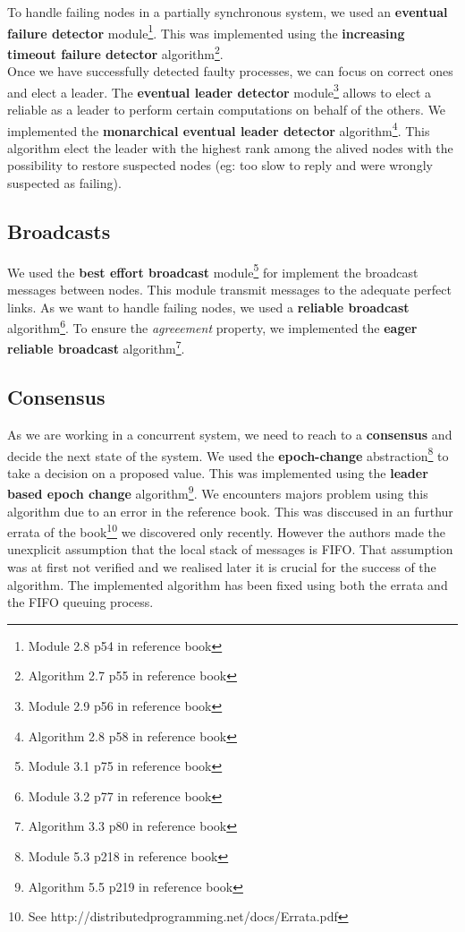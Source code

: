\documentclass[11pt,english,a4paper]{article}
\begin{document}
To handle failing nodes in a partially synchronous system, we used an \textbf{eventual failure detector} module\footnote{Module 2.8 p54 in reference book}.
This was implemented using the \textbf{increasing timeout failure detector} algorithm\footnote{Algorithm 2.7 p55 in reference book}.\\

Once we have successfully detected faulty processes, we can focus on correct ones and elect a leader.
The \textbf{eventual leader detector} module\footnote{Module 2.9 p56 in reference book} allows to elect a reliable as a leader to perform certain computations on behalf of the others.
We implemented the \textbf{monarchical eventual leader detector} algorithm\footnote{Algorithm 2.8 p58 in reference book}.
This algorithm elect the leader with the highest rank among the alived nodes with the possibility to restore suspected nodes (eg: too slow to reply and were wrongly suspected as failing).

\subsection*{Broadcasts}
We used the \textbf{best effort broadcast} module\footnote{Module 3.1 p75 in reference book} for implement the broadcast messages between nodes.
This module transmit messages to the adequate perfect links.
As we want to handle failing nodes, we used a \textbf{reliable broadcast} algorithm\footnote{Module 3.2 p77 in reference book}.
To ensure the \emph{agreeement} property, we implemented the \textbf{eager reliable broadcast} algorithm\footnote{Algorithm 3.3 p80 in reference book}.


\subsection*{Consensus}
As we are working in a concurrent system, we need to reach to a \textbf{consensus} and decide the next state of the system.
We used the \textbf{epoch-change} abstraction\footnote{Module 5.3 p218 in reference book} to take a decision on a proposed value.
This was implemented using the \textbf{leader based epoch change} algorithm\footnote{Algorithm 5.5 p219 in reference book}.
We encounters majors problem using this algorithm due to an error in the reference book.
This was disccused in an furthur errata of the book\footnote{See http://distributedprogramming.net/docs/Errata.pdf} we discovered only recently.
However the authors made the unexplicit assumption that the local stack of messages is FIFO.
That assumption was at first not verified and we realised later it is crucial for the success of the algorithm.
The implemented algorithm has been fixed using both the errata and the FIFO queuing process.\\
\end{document}
